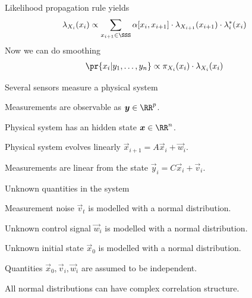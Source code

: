 \documentclass[landscape,footrule]{foils}
\begin{document}
\enlargethispage{1cm}

\vspace*{-1.0cm}

Likelihood propagation rule yields
\begin{align*}
\lambda_{X_i}(x_i)\propto \sum_{x_{i+1}\in \SSS} \alpha[x_{i}, x_{i+1}]\cdot\lambda_{X_{i+1}}(x_{i+1})\cdot \lambda_{i}^*(x_{i})
\end{align*}
Now we can do smoothing 
\begin{align*}
\pr{x_i|y_1,\ldots,y_{n}}\propto \pi_{X_i}(x_i)\cdot\lambda_{X_i}(x_i)
\end{align*}






Several sensors measure a physical system
\begin{triangles}
\item Measurements are observable as $\vec{y}\in\RR^p$.
\item Physical system has an hidden state $\vec{x}\in\RR^n$.
\item Physical system evolves linearly $\vec{x}_{i+1}=A\vec{x}_i+\vec{w}_i$.
\item Measurements are linear from the state $\vec{y}_{i}=C\vec{x}_i+\vec{v}_i$.
\end{triangles}
\vspace*{1cm}

Unknown quantities in the system
\begin{triangles}
\item Measurement noise $\vec{v}_t$ is modelled with a normal distribution.
\item Unknown control signal $\vec{w}_i$ is modelled with a normal distribution.
\item Unknown initial state $\vec{x}_0$ is modelled with a normal distribution.
\item Quantities $\vec{x}_0, \vec{v}_i, \vec{w}_i$ are assumed to be independent.
\item All normal distributions can have complex correlation structure.
\end{triangles}

\end{document}
